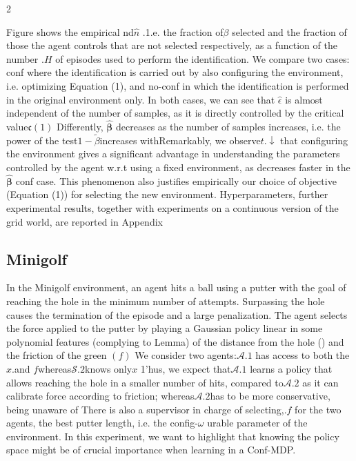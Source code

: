 \documentclass{article}
\begin{document}
\begin{paracol}{2}
\switchcolumn
\RaggedRight

Figure shows the empirical nd$\hat { n }$ .1.e. the fraction of$\beta$
selected and the fraction of those the agent controls that are
not selected respectively, as a function of the number $. { H }$ of
episodes used to perform the identification. We compare two
cases: conf where the identification is carried out by also
configuring the environment, i.e. optimizing Equation (1),
and no-conf in which the identification is performed in the
original environment only. In both cases, we can see that
$\hat { \epsilon }$ is almost independent of the number of samples, as it is
directly controlled by the critical value${ \mathfrak { c } } ( 1 )$ Differently, $\hat { \boldsymbol \beta }$
decreases as the number of samples increases, i.e. the power
of the test$1 - { \tilde { \beta } }$increases withRemarkably, we observe$t . { \downarrow }$
that configuring the environment gives a significant advantage in understanding the parameters controlled by the agent
w.r.t using a fixed environment, as decreases faster in the$\widehat { \boldsymbol \beta }$
conf case. This phenomenon also justifies empirically our
choice of objective (Equation (1)) for selecting the new environment. Hyperparameters, further experimental results, together with experiments on a continuous version of the grid
world, are reported in Appendix


\subsection*{Minigolf}


In the Minigolf environment, an agent hits a ball using a putter with the goal of reaching the hole in the minimum number of attempts. Surpassing the hole causes the termination
of the episode and a large penalization. The agent selects the
force applied to the putter by playing a Gaussian policy linear in some polynomial features (complying to Lemma) of
the distance from the hole () and the friction of the green
$( f )$ We consider two agents:$\mathcal { A } . { 1 }$ has access to both the$x.$and
$f$whereas$\mathcal { S } . { 2 }$knows only$x$ 1'hus, we expect that$\mathcal { A } . { 1 }$ learns
a policy that allows reaching the hole in a smaller number of
hits, compared to$\mathcal { A } . { 2 }$  as it can calibrate force according to
friction; whereas$\mathcal { A } . { 2 }$has to be more conservative, being unaware of There is also a supervisor in charge of selecting,.$f$
for the two agents, the best putter length, i.e. the config-$\omega$
urable parameter of the environment. In this experiment, we
want to highlight that knowing the policy space might be of
crucial importance when learning in a Conf-MDP.



\end{paracol}
\end{document}
